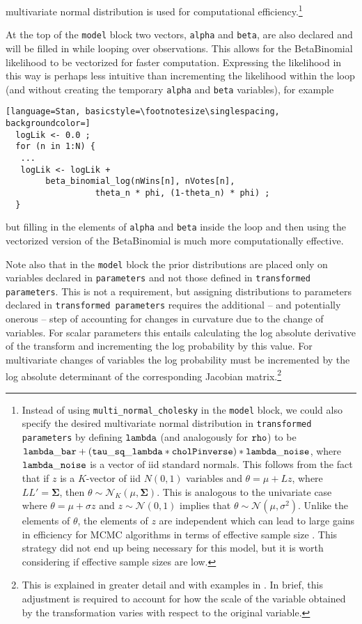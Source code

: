 multivariate normal distribution is used for computational efficiency.\footnote{Instead of using 
{\tt multi\_normal\_cholesky} in the {\tt model} block, we could also specify the desired multivariate 
normal distribution in {\tt transformed parameters} by defining ${\tt lambda}$ (and analogously 
for ${\tt rho}$) to be  ${\tt lambda\_bar + (tau\_sq\_lambda * cholPinverse) * lambda\_noise}$, 
where ${\tt lambda\_noise}$ is a vector of iid standard normals. This follows from the fact that if 
$z$ is a $K$-vector of iid $N(0,1)$ variables and $\theta = \mu + L z$, where $LL' = \boldsymbol{\Sigma}$, 
then $\theta \sim \mathcal{N}_K (\mu, \boldsymbol{\Sigma})$. This is analogous to the univariate case 
where $\theta = \mu + \sigma z$ and $z \sim \mathcal{N}(0,1)$ implies that 
$\theta \sim \mathcal{N}(\mu, \sigma^2)$. Unlike the elements of $\theta$, the elements of $z$ are 
independent which can lead to large gains in efficiency for MCMC algorithms in terms of effective 
sample size . This strategy did not end up being 
necessary for this model, but it is worth considering if effective sample sizes are low.} 

At the top of the {\tt model} block two vectors, {\tt alpha} and {\tt beta}, are also declared 
and will be filled in while looping over observations. This allows for the BetaBinomial likelihood 
to be vectorized for faster computation. Expressing the likelihood in this way is perhaps less 
intuitive than incrementing the likelihood within the loop (and without creating the temporary 
{\tt alpha} and {\tt beta} variables), for example

\begin{lstlisting}[language=Stan, basicstyle=\footnotesize\singlespacing, backgroundcolor=]
  logLik <- 0.0 ;
  for (n in 1:N) {
   ...
   logLik <- logLik +
   		beta_binomial_log(nWins[n], nVotes[n], 
   				  theta_n * phi, (1-theta_n) * phi) ;
  }
\end{lstlisting}
%
\noindent but filling in the elements of {\tt alpha} and {\tt beta} inside the loop and then using the 
vectorized version of the BetaBinomial is much more computationally effective. 

Note also that in the {\tt model} block the prior distributions are placed only on variables declared 
in {\tt parameters}  and not those defined in {\tt transformed parameters}. This is not a requirement, 
but assigning distributions to parameters declared in {\tt transformed parameters} requires the 
additional -- and potentially onerous -- step of accounting for changes in curvature due to the 
change of variables. For scalar parameters this entails calculating the log absolute derivative of 
the transform and incrementing the log probability by this value. For multivariate changes of variables 
the log probability must be incremented by the log absolute determinant of the corresponding 
Jacobian matrix.\footnote{This is explained in greater detail and with examples in . 
In brief, this adjustment is required to account for how the scale of the variable obtained by the 
transformation varies with respect to the original variable.}



